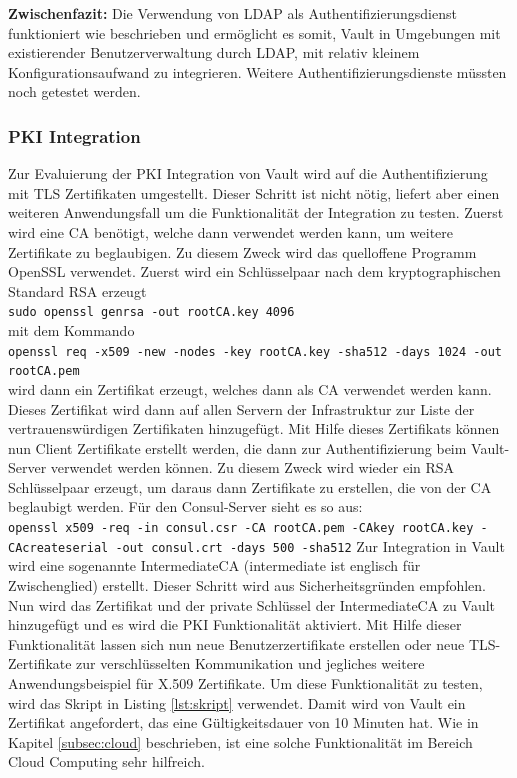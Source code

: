 \documentclass[
book,
a4paper,   
titlepage,  
halfparskip,
12pt        
]{scrartcl}
\newcommand\inline{\lstinline[basicstyle=\ttfamily]}
\begin{document}
\begin{onehalfspacing}
\textbf{Zwischenfazit:} Die Verwendung von LDAP als Authentifizierungsdienst funktioniert wie beschrieben und ermöglicht es somit, Vault in Umgebungen mit existierender Benutzerverwaltung durch LDAP, mit relativ kleinem Konfigurationsaufwand zu integrieren. Weitere Authentifizierungsdienste müssten noch getestet werden.

\subsubsection{\acs{PKI} Integration} 
Zur Evaluierung der \ac{PKI} Integration von Vault wird auf die Authentifizierung mit \ac{TLS} Zertifikaten umgestellt. Dieser Schritt ist nicht nötig, liefert aber einen weiteren Anwendungsfall um die Funktionalität der Integration zu testen. Zuerst wird eine \ac{CA} benötigt, welche dann verwendet werden kann, um weitere Zertifikate zu beglaubigen. Zu diesem Zweck wird das quelloffene Programm OpenSSL verwendet. Zuerst wird ein Schlüsselpaar nach dem kryptographischen Standard RSA erzeugt\\\inline|sudo openssl genrsa -out rootCA.key 4096|\\ mit dem Kommando\\\inline|openssl req -x509 -new -nodes -key rootCA.key -sha512 -days 1024 -out rootCA.pem|\\ wird dann ein Zertifikat erzeugt, welches dann als \ac{CA} verwendet werden kann. Dieses Zertifikat wird dann auf allen Servern der Infrastruktur zur Liste der vertrauenswürdigen Zertifikaten hinzugefügt. Mit Hilfe dieses Zertifikats können nun Client Zertifikate erstellt werden, die dann zur Authentifizierung beim Vault-Server verwendet werden können. Zu diesem Zweck wird wieder ein RSA Schlüsselpaar erzeugt, um daraus dann Zertifikate zu erstellen, die von der \ac{CA} beglaubigt werden. Für den Consul-Server sieht es so aus:\cite{openssl}\\\inline|openssl x509 -req -in consul.csr -CA rootCA.pem -CAkey rootCA.key -CAcreateserial -out consul.crt -days 500 -sha512|\newline
Zur Integration in Vault wird eine sogenannte Intermediate\ac{CA} (intermediate ist englisch für Zwischenglied) erstellt. Dieser Schritt wird aus Sicherheitsgründen empfohlen\cite{vaultpki}. Nun wird das Zertifikat und der private Schlüssel der Intermediate\ac{CA} zu Vault hinzugefügt und es wird die \ac{PKI} Funktionalität aktiviert. Mit Hilfe dieser Funktionalität lassen sich nun neue Benutzerzertifikate erstellen oder neue \ac{TLS}-Zertifikate zur verschlüsselten Kommunikation und jegliches weitere Anwendungsbeispiel für X.509 Zertifikate. Um diese Funktionalität zu testen, wird das Skript in Listing \vref{lst:skript} verwendet. Damit wird von Vault ein Zertifikat angefordert, das eine Gültigkeitsdauer von 10 Minuten hat. Wie in Kapitel \vref{subsec:cloud} beschrieben, ist eine solche Funktionalität im Bereich Cloud Computing sehr hilfreich.


\end{onehalfspacing}
\end{document}
